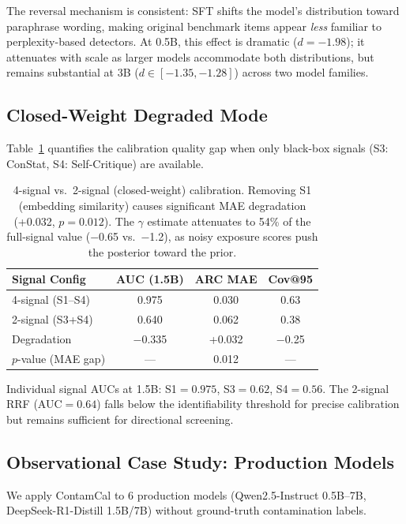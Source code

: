 \documentclass[11pt,a4paper]{article}
\newcommand{\gam}{\gamma}
\begin{document}
The reversal mechanism is consistent: SFT shifts the model's distribution toward paraphrase wording, making original benchmark items appear \emph{less} familiar to perplexity-based detectors. At 0.5B, this effect is dramatic ($d{=}{-}1.98$); it attenuates with scale as larger models accommodate both distributions, but remains substantial at 3B ($d \in [{-}1.35, {-}1.28]$) across two model families.

\subsection{Closed-Weight Degraded Mode}

Table~\ref{tab:2signal} quantifies the calibration quality gap when only black-box signals (S3: ConStat, S4: Self-Critique) are available.

\begin{table}[t]
\centering
\small
\begin{tabular}{lccc}
\toprule
\textbf{Signal Config} & \textbf{AUC (1.5B)} & \textbf{ARC MAE} & \textbf{Cov@95} \\
\midrule
4-signal (S1--S4) & 0.975 & 0.030 & 0.63 \\
2-signal (S3+S4) & 0.640 & 0.062 & 0.38 \\
\midrule
Degradation & $-$0.335 & +0.032 & $-$0.25 \\
$p$-value (MAE gap) & --- & 0.012 & --- \\
\bottomrule
\end{tabular}
\caption{4-signal vs.\ 2-signal (closed-weight) calibration. Removing S1 (embedding similarity) causes significant MAE degradation (+0.032, $p{=}0.012$). The $\gam$ estimate attenuates to 54\% of the full-signal value ($-$0.65 vs.\ $-$1.2), as noisy exposure scores push the posterior toward the prior.}
\label{tab:2signal}
\end{table}

Individual signal AUCs at 1.5B: S1${=}0.975$, S3${=}0.62$, S4${=}0.56$. The 2-signal RRF (AUC${=}0.64$) falls below the identifiability threshold for precise calibration but remains sufficient for directional screening.

\subsection{Observational Case Study: Production Models}

We apply ContamCal to 6 production models (Qwen2.5-Instruct 0.5B--7B, DeepSeek-R1-Distill 1.5B/7B) without ground-truth contamination labels.
\end{document}
